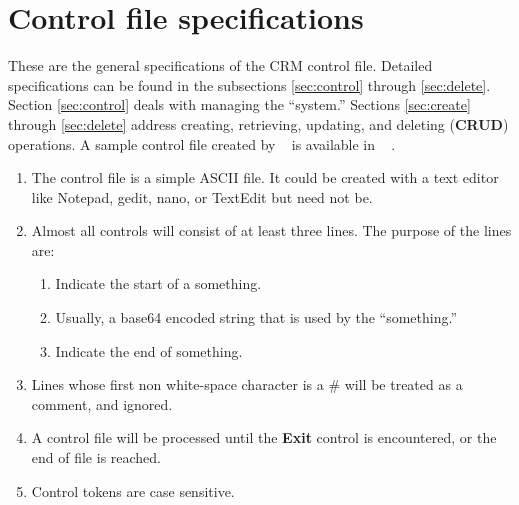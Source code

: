 \section{Control file specifications}
\renewcommand{\MyAlsoCommand}[0] {$<$CRMID$>$ & The identifier as returned from the Creation operation.  CRMID is always plain text.& $</$CRMID$>$}
\renewcommand{\MyAlsoCommandTwo}[0]{$<$Comment$>$ & A plain text message that is output to standard out when processed.& $</$Comment$>$}

These are the general specifications of the CRM control file.  Detailed specifications can be found in the subsections \ref{sec:control} through \ref{sec:delete}.  Section \ref{sec:control} deals with managing the ``system.'' Sections \ref{sec:create} through \ref{sec:delete} address creating, retrieving, updating, and deleting (\textbf{CRUD}) operations.  A sample control file created by \lstlistingname~ is available in \lstlistingname~ .
\begin{enumerate}
\item The control file is a simple ASCII file.  It could be created with a text editor like Notepad, gedit, nano, or TextEdit but need not be.
\item Almost all controls will consist of at least three lines.  The purpose of the lines are:
  \begin{enumerate}
  \item Indicate the start of a something.
  \item Usually, a base64 encoded string that is used by the ``something.''
  \item Indicate the end of something.
  \end{enumerate}
\item Lines whose first non white-space character is a \# will be treated as a comment, and ignored.
\item A control file will be processed until the \textbf{Exit} control is encountered, or the end of file is reached.
  \item Control tokens are case sensitive.
\end{enumerate}

